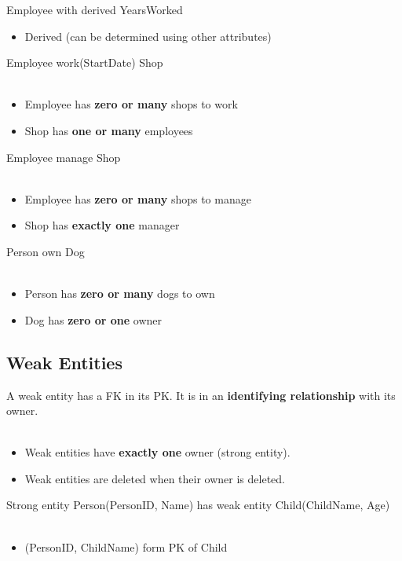 \documentclass[11pt, a4paper]{article}
\begin{document}
    Employee with derived YearsWorked 
    \begin{itemize}
        \item Derived (can be determined using other attributes) 
    \end{itemize}

    Employee work(StartDate) Shop \\\\ 
    \begin{itemize}
        \item Employee has \textbf{zero or many} shops to work 
        \item Shop has \textbf{one or many} employees 
    \end{itemize}

    Employee manage Shop \\\\ 
    \begin{itemize}
        \item Employee has \textbf{zero or many} shops to manage 
        \item Shop has \textbf{exactly one} manager 
    \end{itemize}

    Person own Dog \\\\ 
    \begin{itemize}
        \item Person has \textbf{zero or many} dogs to own 
        \item Dog has \textbf{zero or one} owner 
    \end{itemize}

    \subsection{Weak Entities}
    A weak entity has a FK in its PK. It is in an \textbf{identifying 
    relationship} with its owner. \\\\ 
    \begin{itemize}
        \item Weak entities have \textbf{exactly one} owner (strong entity). 
        \item Weak entities are deleted when their owner is deleted. 
    \end{itemize}
    Strong entity Person(PersonID, Name) has weak entity Child(ChildName, Age) \\\\ 
    \begin{itemize}
        \item (PersonID, ChildName) form PK of Child 
    \end{itemize}
\end{document}
